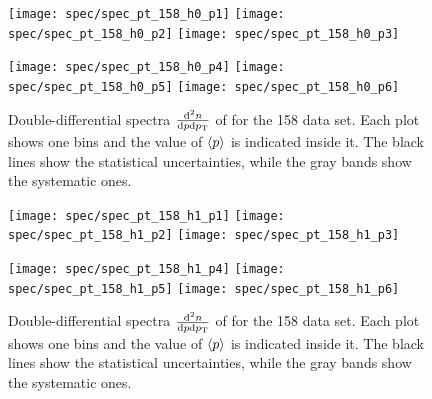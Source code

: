 \begin{figure}[!ht]
  \centering

  \texttt{[image: spec/spec\_pt\_158\_h0\_p1]}
  \texttt{[image: spec/spec\_pt\_158\_h0\_p2]}
  \texttt{[image: spec/spec\_pt\_158\_h0\_p3]}

  \texttt{[image: spec/spec\_pt\_158\_h0\_p4]}
  \texttt{[image: spec/spec\_pt\_158\_h0\_p5]}
  \texttt{[image: spec/spec\_pt\_158\_h0\_p6]}

  \caption{Double-differential spectra $\frac{\text{d}^2n}{\text{d}p\text{d}p_\text{T}}$
    of \lamb for the 158 \GeVc data set. Each plot shows one \pp bins and the value
    of $\langle p\rangle$ is indicated inside it. The black lines show the statistical
    uncertainties, while the gray bands show the systematic ones.}
  \label{fig:hadron:spec:vzero:all158:h0}
\end{figure}


\begin{figure}[!ht]
  \centering

  \texttt{[image: spec/spec\_pt\_158\_h1\_p1]}
  \texttt{[image: spec/spec\_pt\_158\_h1\_p2]}
  \texttt{[image: spec/spec\_pt\_158\_h1\_p3]}

  \texttt{[image: spec/spec\_pt\_158\_h1\_p4]}
  \texttt{[image: spec/spec\_pt\_158\_h1\_p5]}
  \texttt{[image: spec/spec\_pt\_158\_h1\_p6]}

  \caption{Double-differential spectra $\frac{\text{d}^2n}{\text{d}p\text{d}p_\text{T}}$
    of \antilamb for the 158 \GeVc data set. Each plot shows one \pp bins and the value
    of $\langle p\rangle$ is indicated inside it. The black lines show the statistical
    uncertainties, while the gray bands show the systematic ones.}
  \label{fig:hadron:spec:vzero:all158:h1}
\end{figure}


